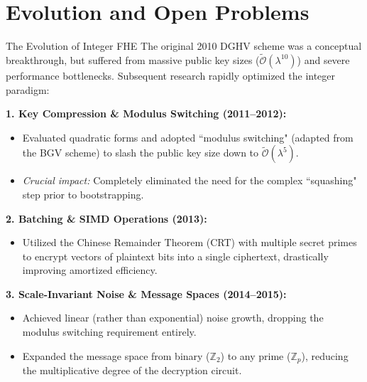 \documentclass[10pt,handout]{beamer}
\begin{document}
\section{Evolution and Open Problems}

\begin{frame}{The Evolution of Integer FHE}
    The original 2010 DGHV scheme was a conceptual breakthrough, but suffered from massive public key sizes ($\tilde{\mathcal{O}}(\lambda^{10})$) and severe performance bottlenecks. Subsequent research rapidly optimized the integer paradigm:
    \pause

    \vspace{0.2cm}
    \textbf{1. Key Compression \& Modulus Switching (2011--2012):}
    \begin{itemize}
        \item Evaluated quadratic forms and adopted ``modulus switching" (adapted from the BGV scheme) to slash the public key size down to $\tilde{\mathcal{O}}(\lambda^5)$.
        \item \textit{Crucial impact:} Completely eliminated the need for the complex ``squashing" step prior to bootstrapping.
    \end{itemize}
    \pause

    \textbf{2. Batching \& SIMD Operations (2013):}
    \begin{itemize}
        \item Utilized the Chinese Remainder Theorem (CRT) with multiple secret primes to encrypt vectors of plaintext bits into a single ciphertext, drastically improving amortized efficiency.
    \end{itemize}
    \pause

    \textbf{3. Scale-Invariant Noise \& Message Spaces (2014--2015):}
    \begin{itemize}
        \item Achieved linear (rather than exponential) noise growth, dropping the modulus switching requirement entirely.
        \item Expanded the message space from binary ($\mathbb{Z}_2$) to any prime ($\mathbb{Z}_p$), reducing the multiplicative degree of the decryption circuit.
    \end{itemize}
\end{frame}
\end{document}
